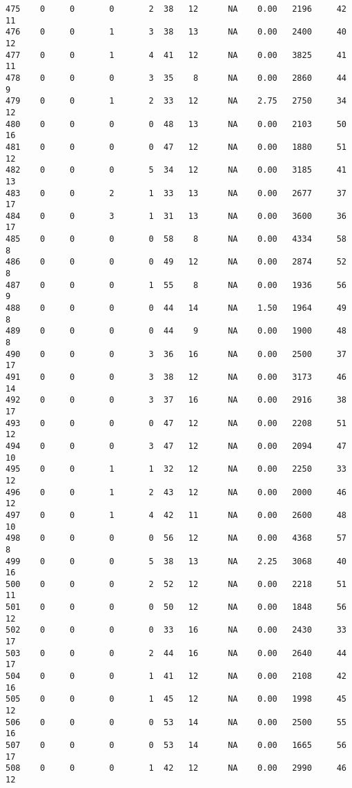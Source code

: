 \documentclass[
  letterpaper,
  DIV=11,
  numbers=noendperiod]{scrreprt}
\begin{document}
\begin{verbatim}
475    0     0       0       2  38   12      NA    0.00   2196     42      11
476    0     0       1       3  38   13      NA    0.00   2400     40      12
477    0     0       1       4  41   12      NA    0.00   3825     41      11
478    0     0       0       3  35    8      NA    0.00   2860     44       9
479    0     0       1       2  33   12      NA    2.75   2750     34      12
480    0     0       0       0  48   13      NA    0.00   2103     50      16
481    0     0       0       0  47   12      NA    0.00   1880     51      12
482    0     0       0       5  34   12      NA    0.00   3185     41      13
483    0     0       2       1  33   13      NA    0.00   2677     37      17
484    0     0       3       1  31   13      NA    0.00   3600     36      17
485    0     0       0       0  58    8      NA    0.00   4334     58       8
486    0     0       0       0  49   12      NA    0.00   2874     52       8
487    0     0       0       1  55    8      NA    0.00   1936     56       9
488    0     0       0       0  44   14      NA    1.50   1964     49       8
489    0     0       0       0  44    9      NA    0.00   1900     48       8
490    0     0       0       3  36   16      NA    0.00   2500     37      17
491    0     0       0       3  38   12      NA    0.00   3173     46      14
492    0     0       0       3  37   16      NA    0.00   2916     38      17
493    0     0       0       0  47   12      NA    0.00   2208     51      12
494    0     0       0       3  47   12      NA    0.00   2094     47      10
495    0     0       1       1  32   12      NA    0.00   2250     33      12
496    0     0       1       2  43   12      NA    0.00   2000     46      12
497    0     0       1       4  42   11      NA    0.00   2600     48      10
498    0     0       0       0  56   12      NA    0.00   4368     57       8
499    0     0       0       5  38   13      NA    2.25   3068     40      16
500    0     0       0       2  52   12      NA    0.00   2218     51      11
501    0     0       0       0  50   12      NA    0.00   1848     56      12
502    0     0       0       0  33   16      NA    0.00   2430     33      17
503    0     0       0       2  44   16      NA    0.00   2640     44      17
504    0     0       0       1  41   12      NA    0.00   2108     42      16
505    0     0       0       1  45   12      NA    0.00   1998     45      12
506    0     0       0       0  53   14      NA    0.00   2500     55      16
507    0     0       0       0  53   14      NA    0.00   1665     56      17
508    0     0       0       1  42   12      NA    0.00   2990     46      12

\end{verbatim}
\end{document}
